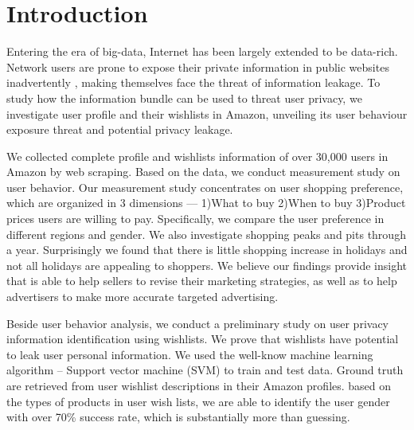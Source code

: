 \section{Introduction}
Entering the era of big-data, Internet has been largely extended to be data-rich. Network users are prone to expose their private information in public websites inadvertently \cite{frankowski2006you}, making themselves face the threat of information leakage. To study how the information bundle can be used to threat user privacy, we investigate user profile and their wishlists in Amazon, unveiling its user behaviour exposure threat and potential privacy leakage. 

We collected complete profile and wishlists information of over 30,000 users in Amazon by web scraping. Based on the data, we conduct measurement study on user behavior. Our measurement study concentrates on user shopping preference, which are organized in 3 dimensions — 1)What to buy 2)When to buy 3)Product prices users are willing to pay. Specifically, we compare the user preference in different regions and gender. We also investigate shopping peaks and pits through a year. Surprisingly we found that there is little shopping increase in holidays and not all holidays are appealing to shoppers. We believe our findings provide insight that is able to help sellers to revise their marketing strategies, as well as to help advertisers to make more accurate targeted advertising. 

Beside user behavior analysis, we conduct a preliminary study on user privacy information identification using wishlists. We prove that wishlists have potential to leak user personal information. We used the well-know machine learning algorithm -- Support vector machine (SVM) to train and test data. Ground truth are retrieved from user wishlist descriptions in their Amazon profiles. based on the types of products in user wish lists, we are able to identify the user gender with over 70\% success rate, which is substantially more than guessing. 
